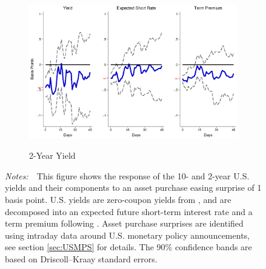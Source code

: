 \documentclass[a4paper, 12pt]{article}
\newcommand{\figtext}[1]{
	\vspace{-1ex}
	\captionsetup{justification=justified,font=footnotesize}
	\caption*{#1}
}
\newcommand{\fignotes}[1]{\figtext{\emph{Notes:~}~#1}}
\begin{document}
\begin{appendices}
\begin{landscape}
\begin{figure}[tbph]
\begin{center}
\begin{minipage}{\linewidth}
\begin{center}
						\begin{subfigure}[t]{\linewidth}
							\includegraphics[trim={0cm 0cm 0cm 0cm},clip,height=0.35\textheight,width=\linewidth]{../Figures/LSAPUSDnomyptp24m.eps} \\
							\vspace{-0.35cm}
							\caption{2-Year Yield} \label{subfig:LPUS2Ylsap}
						\end{subfigure}
						\vspace{-0.45cm}
					\end{center}
					\fignotes{This figure shows the response of the 10- and 2-year U.S. yields and their components to an asset purchase easing surprise of 1 basis point. U.S. yields are zero-coupon yields from \cite{GSW:2007}, and are decomposed into an expected future short-term interest rate and a term premium following \cite{KimWright:2005}. Asset purchase surprises are identified using intraday data around U.S. monetary policy announcements, see section \ref{sec:USMPS} for details. The 90\% confidence bands are based on Driscoll--Kraay standard errors.}
				\end{minipage}
			\end{center}
		\end{figure}
		

\end{landscape}
\end{appendices}
\end{document}
